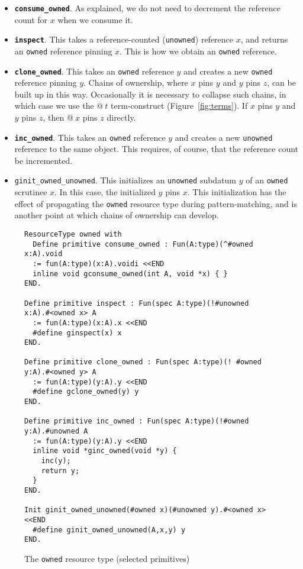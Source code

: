 \documentclass[9pt,natbib]{sigplanconf}
\begin{document}
\begin{itemize}
\item \textbf{\texttt{consume\_owned}}.  As explained, we do not need to 
decrement the reference count for $x$ when we consume it.

\item \textbf{\texttt{inspect}}. This takes a reference-counted
  (\texttt{unowned}) reference $x$, and returns an \texttt{owned}
  reference pinning $x$.  This is how we obtain an \texttt{owned}
  reference.

\item \textbf{\texttt{clone\_owned}}. This takes an \texttt{owned}
  reference $y$ and creates a new \texttt{owned} reference pinning
  $y$.  Chains of ownership, where $x$ pins $y$ and $y$ pins $z$, can
  be built up in this way.  Occasionally it is necessary to collapse
  such chains, in which case we use the $@\ t$ term-construct
  (Figure~\ref{fig:terms}).  If $x$ pins $y$ and $y$ pins $z$, then
  $@\ x$ pins $z$ directly.

\item \textbf{\texttt{inc\_owned}}. This takes an \texttt{owned}
  reference $y$ and creates a new \texttt{unowned} reference to the
  same object.  This requires, of course, that the reference count
  be incremented.

\item \texttt{ginit\_owned\_unowned}. This initializes an
  \texttt{unowned} subdatum $y$ of an \texttt{owned} scrutinee $x$.
  In this case, the initialized $y$ pins $x$.  This initialization has
  the effect of propagating the \texttt{owned} resource type during
  pattern-matching, and is another point at which chains of ownership
  can develop.

\end{itemize}

\begin{figure*}
\small
\begin{verbatim}
ResourceType owned with 
  Define primitive consume_owned : Fun(A:type)(^#owned x:A).void
  := fun(A:type)(x:A).voidi <<END
  inline void gconsume_owned(int A, void *x) { }
END.

Define primitive inspect : Fun(spec A:type)(!#unowned x:A).#<owned x> A 
  := fun(A:type)(x:A).x <<END
  #define ginspect(x) x
END.

Define primitive clone_owned : Fun(spec A:type)(! #owned y:A).#<owned y> A
  := fun(A:type)(y:A).y <<END
  #define gclone_owned(y) y
END.

Define primitive inc_owned : Fun(spec A:type)(!#owned y:A).#unowned A
  := fun(A:type)(y:A).y <<END
  inline void *ginc_owned(void *y) {
    inc(y);
    return y;
  }
END.

Init ginit_owned_unowned(#owned x)(#unowned y).#<owned x> <<END
  #define ginit_owned_unowned(A,x,y) y
END.
\end{verbatim}
\caption{The \texttt{owned} resource type (selected primitives)}
\label{fig:owned}
\end{figure*}
\end{document}
